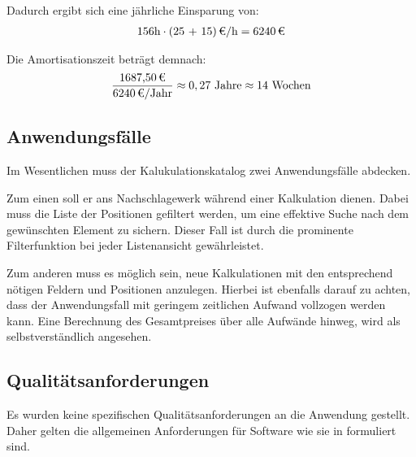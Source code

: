 Dadurch ergibt sich eine jährliche Einsparung von:
\begin{eqnarray*}
156 \mbox{h} \cdot \eur{(25 + 15)}{\mbox{/h}} = \eur{6240}
\end{eqnarray*}

Die Amortisationszeit beträgt demnach:
\begin{eqnarray*}
\frac{\eur{1687,50}}{\eur{6240}\mbox{/Jahr}} \approx 0,27 \mbox{ Jahre} \approx
14 \mbox{ Wochen}
\end{eqnarray*}

\subsection{Anwendungsfälle}
\label{sec:Anwendungsfaelle}
Im Wesentlichen muss der Kalukulationskatalog zwei Anwendungsfälle abdecken.

Zum einen soll er ans Nachschlagewerk während einer Kalkulation dienen. Dabei
muss die Liste der Positionen gefiltert werden, um eine effektive Suche nach dem
gewünschten Element zu sichern. Dieser Fall ist durch die prominente
Filterfunktion bei jeder Listenansicht gewährleistet.

Zum anderen muss es möglich sein, neue Kalkulationen mit den entsprechend
nötigen Feldern und Positionen anzulegen. Hierbei ist ebenfalls darauf zu
achten, dass der Anwendungsfall mit geringem zeitlichen Aufwand vollzogen werden
kann. Eine Berechnung des Gesamtpreises über alle Aufwände hinweg, wird als
selbstverständlich angesehen.


\subsection{Qualitätsanforderungen}
\label{sec:Qualitaetsanforderungen}
Es wurden keine spezifischen Qualitätsanforderungen an die Anwendung gestellt.
Daher gelten die allgemeinen Anforderungen für Software wie sie in
\citet{ISO9126} formuliert sind.
